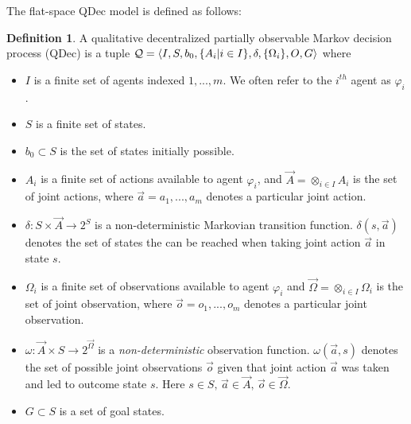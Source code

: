 \documentclass[letterpaper]{article} %
\theoremstyle{definition}
\newtheorem{definition}{Definition}[section]
\begin{document}
The flat-space QDec model is defined as follows:
\begin{definition} A qualitative decentralized partially observable Markov decision process
(QDec) is a tuple ${\cal Q} = \langle  I, S, b_0,\{A_i | i\in I\}, \delta, \{\Omega_i\}, O, G\rangle$
where
\begin{itemize}
\item $I$ is a finite set of agents indexed $1,...,m$. We often refer to the $i^{th}$ agent as $\varphi_i$.

\item $S$ is a finite set of states.

\item$b_0 \subset S$ is the set of states initially possible.

\item  $A_i$ is a finite set of actions available to agent $\varphi_i$,
and $\vec{A} = \otimes_{i \in I} A_i$ is the set of joint actions,
where
$\vec{a} = {a_1,...,a_m}$ denotes a particular joint action.

\item $\delta: S \times \vec{A} \rightarrow 2^S$ is a non-deterministic Markovian transition function. $\delta(s, \vec{a})
$ denotes the set of states the can be reached when taking joint action $\vec{a}$ in state $s$.

\item $\Omega_i$ is a finite set of observations available to agent $\varphi_i$ and
$\vec{\Omega} = \otimes_{i \in I} \Omega_i$ is the set of joint
observation, where $\vec{o} = {o_1,...,o_m}$ denotes a particular joint
observation.

\item $\omega : \vec{A} \times S \rightarrow 2^{\vec{\Omega}}$ is a {\em non-deterministic\/} observation function. $\omega(\vec{a}, s)$
denotes the set of possible joint observations $\vec{o}$ given that
joint action $\vec{a}$ was taken and led to outcome state $s$. Here $s \in S,\, \vec{a}
\in \vec{A},\, \vec{o} \in \vec{\Omega}$.

\item $G \subset S$ is a set of goal states.

\end{itemize}
\label{11_def:DEC-POMDP}
\end{definition}
\end{document}
